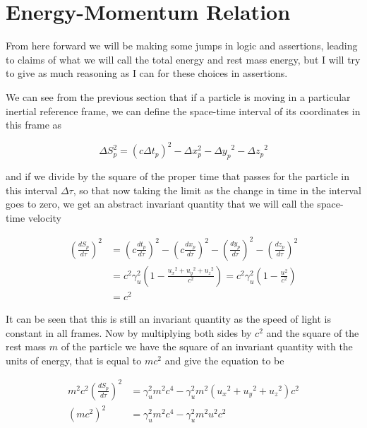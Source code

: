 \section{Energy-Momentum Relation} \label{sect: Energy-Momentum Relation}

From here forward we will be making some jumps in logic and assertions, leading to claims of what we will call the total energy and rest mass energy, but I will try to give as much reasoning as I can for these choices in assertions.

We can see from the previous section that if a particle is moving in a particular inertial reference frame, we can define the space-time interval of its coordinates in this frame as

\begin{equation}
	\Delta S_p^2 = (c\Delta {t}_p)^2-\Delta x_p^2-{\Delta y_p}^2-{\Delta z_p}^2
\end{equation}

and if we divide by the square of the proper time that passes for the particle in this interval ${\Delta\tau}$, so that now taking the limit as the change in time in the interval goes to zero, we get an abstract invariant quantity that we will call the space-time velocity

\begin{equation}
	\begin{aligned}
		\left(\frac{dS_p}{d\tau}\right)^2 & = \left(c\frac{{{dt}_{p}}}{d\tau}\right)^2-\left(c\frac{dx_p}{d\tau}\right)^2-\left(\frac{dy_p}{d\tau}\right)^2-\left(\frac{dz_p}{d\tau}\right)^2 \\
		                                  & = {c}^2\gamma_{u}^2 \left( 1-\frac{{{u}_{x}}^2 + {{u}_{y}}^2 + {{u}_{z}}^2}{{c}^2} \right) = {c}^2\gamma_{u}^2 \left( 1-\frac{u^2}{{c}^2} \right) \\
		                                  & = {c}^2
	\end{aligned}
\end{equation}

It can be seen that this is still an invariant quantity as the speed of light is constant in all frames.
Now by multiplying both sides by ${c}^2$ and the square of the rest mass ${m}$ of the particle we have the square of an invariant quantity with the units of energy, that is equal to ${m}{c}^2$ and give the equation to be

\begin{equation}
	\label{eq: energy-momentum derivation}
	\begin{aligned}
		m^2 {c}^2 \left(\frac{dS_p}{d\tau}\right)^2 & = \gamma_{u}^2 m^2 c^4-\gamma_{u}^2 m^2 \left( {{u}_{x}}^2 + {{u}_{y}}^2 + {{u}_{z}}^2 \right) {c}^2 \\
		({m}{c}^2)^2                                & = \gamma_{u}^2 m^2 c^4-\gamma_{u}^2 m^2 u^2 {c}^2
	\end{aligned}
\end{equation}

